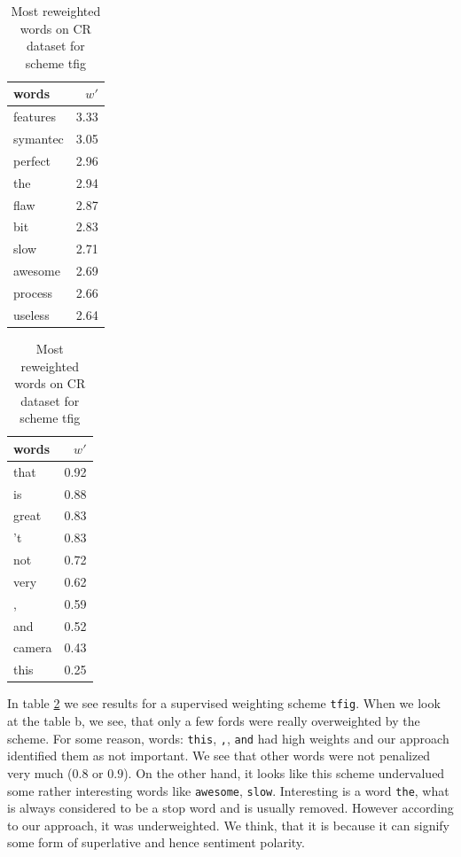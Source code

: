 \begin{table}[H]
    \centering
    \begin{minipage}{.4\linewidth}
      \centering
        \begin{tabular}{lr}
\toprule
    words &  $w'$ \\
\midrule
 features &  3.33 \\
 symantec &  3.05 \\
  perfect &  2.96 \\
      the &  2.94 \\
     flaw &  2.87 \\
      bit &  2.83 \\
     slow &  2.71 \\
  awesome &  2.69 \\
  process &  2.66 \\
  useless &  2.64 \\
\bottomrule
\end{tabular}

    \end{minipage}
    \begin{minipage}{.4\linewidth}
      \centering
        \begin{tabular}{lr}
\toprule
  words &  $w'$ \\
\midrule
   that &  0.92 \\
     is &  0.88 \\
  great &  0.83 \\
     't &  0.83 \\
    not &  0.72 \\
   very &  0.62 \\
      , &  0.59 \\
    and &  0.52 \\
 camera &  0.43 \\
   this &  0.25 \\
\bottomrule
\end{tabular}

    \end{minipage} 
    \caption{Most reweighted words on CR dataset for scheme tfig}
    \label{tab:words:CR:tfig}
\end{table}

    In table \ref{tab:words:CR:tfig} we see results for a supervised weighting scheme \texttt{tfig}.
    When we look at the table b, we see, that only a few fords were really overweighted by the scheme. 
    For some reason, words: \texttt{this}, \texttt{,}, \texttt{and} had high weights and our approach identified them as not important.
    We see that other words were not penalized very much ($0.8$ or $0.9$).
    On the other hand, it looks like this scheme undervalued some rather interesting words like \texttt{awesome}, \texttt{slow}.
    Interesting is a word \texttt{the}, what is always considered to be a stop word and is usually removed. 
    However according to our approach, it was underweighted. 
    We think, that it is because it can signify some form of superlative and hence sentiment polarity.
    

